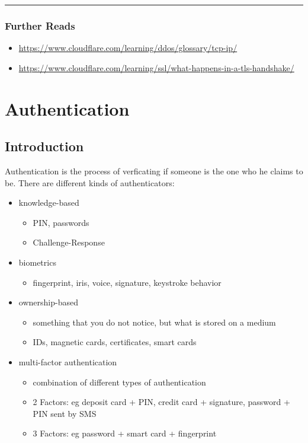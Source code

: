 \documentclass[11pt]{article}
\begin{document}
\noindent\rule{\textwidth}{0.5pt}
\subsubsection{Further Reads}
\label{sec:orgda8aa1c}
\begin{itemize}
\item \url{https://www.cloudflare.com/learning/ddos/glossary/tcp-ip/}
\item \url{https://www.cloudflare.com/learning/ssl/what-happens-in-a-tls-handshake/}
\end{itemize}
\section{Authentication}
\label{sec:org5405c6e}
\subsection{Introduction}
\label{sec:org1abc15a}
Authentication is the process of verficating if someone is the one who he claims to be. There are different kinds of authenticators:
\begin{itemize}
\item knowledge-based
\begin{itemize}
\item PIN, passwords
\item Challenge-Response
\end{itemize}
\item biometrics
\begin{itemize}
\item fingerprint, iris, voice, signature, keystroke behavior
\end{itemize}
\item ownership-based
\begin{itemize}
\item something that you do not notice, but what is stored on a medium
\item IDs, magnetic cards, certificates, smart cards
\end{itemize}
\item multi-factor authentication
\begin{itemize}
\item combination of different types of authentication
\item 2 Factors: eg deposit card + PIN, credit card + signature, password + PIN sent by SMS
\item 3 Factors: eg password + smart card + fingerprint
\end{itemize}
\end{itemize}
\end{document}
